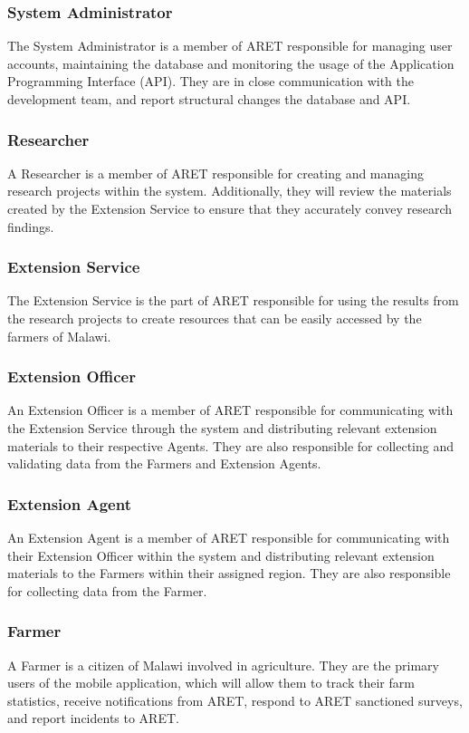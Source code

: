 \documentclass[12pt,letterpaper]{article}
\begin{document}
\subsubsection*{System Administrator}
The System Administrator is a member of ARET responsible for managing user accounts, maintaining the database and monitoring the usage of the Application Programming Interface (API). They are in close communication with the development team, and report structural changes the database and API.

\subsubsection*{Researcher}
A Researcher is a member of ARET responsible for creating and managing research projects within the system. Additionally, they will review the materials created by the Extension Service to ensure that they accurately convey research findings.

\subsubsection*{Extension Service}
The Extension Service is the part of ARET responsible for using the results from the research projects to create resources that can be easily accessed by the farmers of Malawi.

\subsubsection*{Extension Officer}
An Extension Officer is a member of ARET responsible for communicating with the Extension Service through the system and distributing relevant extension materials to their respective Agents. They are also responsible for collecting and validating data from the Farmers and Extension Agents.

\subsubsection*{Extension Agent}
An Extension Agent is a member of ARET responsible for communicating with their Extension Officer within the system and distributing relevant extension materials to the Farmers within their assigned region. They are also responsible for collecting data from the Farmer.

\subsubsection*{Farmer}
A Farmer is a citizen of Malawi involved in agriculture. They are the primary users of the mobile application, which will allow them to track their farm statistics, receive notifications from ARET, respond to ARET sanctioned surveys, and report incidents to ARET.
\end{document}
